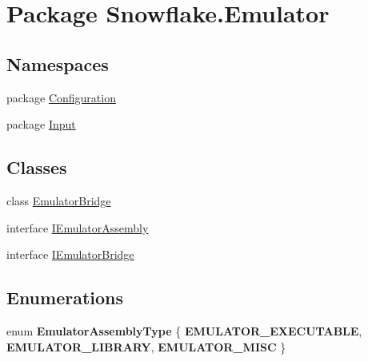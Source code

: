 \hypertarget{namespace_snowflake_1_1_emulator}{}\section{Package Snowflake.\+Emulator}
\label{namespace_snowflake_1_1_emulator}
\subsection*{Namespaces}
\begin{DoxyCompactItemize}
\item 
package \hyperlink{namespace_snowflake_1_1_emulator_1_1_configuration}{Configuration}
\item 
package \hyperlink{namespace_snowflake_1_1_emulator_1_1_input}{Input}
\end{DoxyCompactItemize}
\subsection*{Classes}
\begin{DoxyCompactItemize}
\item 
class \hyperlink{class_snowflake_1_1_emulator_1_1_emulator_bridge}{Emulator\+Bridge}
\item 
interface \hyperlink{interface_snowflake_1_1_emulator_1_1_i_emulator_assembly}{I\+Emulator\+Assembly}
\item 
interface \hyperlink{interface_snowflake_1_1_emulator_1_1_i_emulator_bridge}{I\+Emulator\+Bridge}
\end{DoxyCompactItemize}
\subsection*{Enumerations}
\begin{DoxyCompactItemize}
\item 
\hypertarget{namespace_snowflake_1_1_emulator_a31029bdf1c1f4559664a26c486df1603}{}enum {\bfseries Emulator\+Assembly\+Type} \{ {\bfseries E\+M\+U\+L\+A\+T\+O\+R\+\_\+\+E\+X\+E\+C\+U\+T\+A\+B\+L\+E}, 
{\bfseries E\+M\+U\+L\+A\+T\+O\+R\+\_\+\+L\+I\+B\+R\+A\+R\+Y}, 
{\bfseries E\+M\+U\+L\+A\+T\+O\+R\+\_\+\+M\+I\+S\+C}
 \}\label{namespace_snowflake_1_1_emulator_a31029bdf1c1f4559664a26c486df1603}

\end{DoxyCompactItemize}
